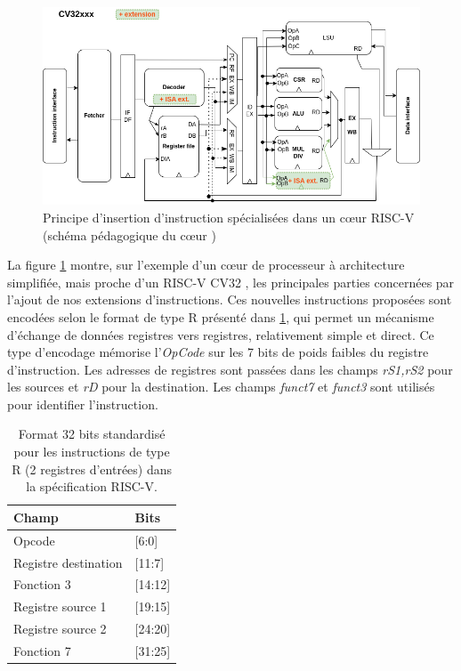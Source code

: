 \documentclass[../main.tex]{subfiles}
\begin{document}
\begin{figure}
\centering
\includegraphics[scale=0.5]{chapter3/figs/CV32xxx+Ext.png}
\caption{Principe d'insertion d'instruction spécialisées dans un cœur RISC-V (schéma pédagogique du cœur \cite{ArchiRISC:V})}
\label{RV2regs}
\end{figure}

La figure \ref{RV2regs} montre, sur l'exemple d’un cœur de processeur à architecture simplifiée, mais proche d'un RISC-V CV32 \cite{ArchiRISC:V}, les principales parties concernées par l'ajout de nos extensions d'instructions.
Ces nouvelles instructions proposées sont encodées selon le format de type R présenté dans \ref{R_instruction}, qui permet un mécanisme d'échange de données registres vers registres, relativement simple et direct. Ce type d'encodage mémorise l'\textit{OpCode} sur les 7 bits de poids faibles du registre d'instruction. Les adresses de registres sont passées dans les champs \textit{rS1,rS2} pour les sources et \textit{rD} pour la destination. Les champs \textit{funct7} et \textit{funct3} sont utilisés pour identifier l'instruction.

\begin{table}[]
    \centering
    \begin{tabular}{l|l}
         \textbf{Champ} & \textbf{Bits}  \\
         \bottomrule
         Opcode                 & [6:0]  \\
         Registre destination   & [11:7]  \\
         Fonction 3             & [14:12]  \\
         Registre source 1      & [19:15]  \\
         Registre source 2      & [24:20]  \\
         Fonction 7             & [31:25]  \\
    \end{tabular}
    \caption{Format 32 bits standardisé pour les instructions de type R (2 registres d'entrées) dans la spécification RISC-V.}
    \label{R_instruction}
\end{table}
\end{document}
